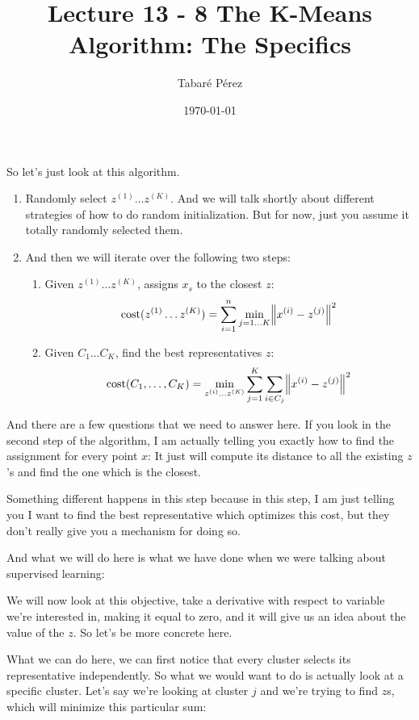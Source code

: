 \documentclass[a4paper, 12pt]{article}
\author{Tabaré Pérez}
\date{\today}
\title{Lecture 13 - 8 The K-Means Algorithm: The Specifics}
\begin{document}
\maketitle
So let's just look at this algorithm.

\begin{enumerate}
\item Randomly select \(z^{(1)} \ldots z^{(K)}\). And we will talk shortly about
different strategies of how to do random initialization. But for now, just
you assume it totally randomly selected them.

\item And then we will iterate over the following two steps:

\begin{enumerate}
\item Given \(z^{(1)} \ldots z^{(K)}\), assigns \(x_s\) to the closest \(z\):
\[\text{cost}(z^{(1)} \ldots z^{(K)})=\sum_{i=1}^{n} \min_{j=1 \ldots K} \norm{x^{(i)} - z^{(j)}}^2\]
\item Given \(C_1 \ldots C_K\), find the best representatives \(z\):
\[\text{cost}(C_1, \ldots ,C_K) = \min_{z^{(i)} \ldots z^{(K)}}\sum_{j=1}^{K}\sum_{i \in C_j} \norm{x^{(i)} - z^{(j)}}^2\]
\end{enumerate}
\end{enumerate}

And there are a few questions that we need to answer here. If you look in the
second step of the algorithm, I am actually telling you exactly how to find the
assignment for every point \(x\): It just will compute its distance to all the
existing \(z\)'s and find the one which is the closest.

Something different happens in this step because in this step, I am just telling
you I want to find the best representative which optimizes this cost, but they
don't really give you a mechanism for doing so.

And what we will do here is what we have done when we were talking about
supervised learning:

We will now look at this objective, take a derivative with respect to variable
we're interested in, making it equal to zero, and it will give us an idea about
the value of the \(z\). So let's be more concrete here.

What we can do here, we can first notice that every cluster selects its
representative independently. So what we would want to do is actually look at a
specific cluster. Let's say we're looking at cluster \(j\) and we're trying to
find \(z\)s, which will minimize this particular sum:
\end{document}
